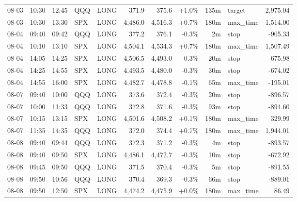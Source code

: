 \documentclass[11pt,a4paper,twoside]{article}
\begin{document}
\begin{center}
\begin{longtable}{>{\color{txtmain}}l l l l l r r r r >{\color{txtmain}}l r}
08-03 & 10:30 & 12:45 & QQQ & LONG & 371.9 & 375.6 & \textcolor{wingreen}{+1.0\%} & 135m & target & \textcolor{wingreen}{2,975.04} \\
08-03 & 10:30 & 13:30 & SPX & LONG & 4,486.0 & 4,516.3 & \textcolor{wingreen}{+0.7\%} & 180m & max\_time & \textcolor{wingreen}{1,514.00} \\
08-04 & 09:40 & 09:42 & QQQ & LONG & 377.2 & 376.1 & \textcolor{lossred}{-0.3\%} & 2m & stop & \textcolor{lossred}{-905.33} \\
08-04 & 10:10 & 13:10 & SPX & LONG & 4,504.1 & 4,534.3 & \textcolor{wingreen}{+0.7\%} & 180m & max\_time & \textcolor{wingreen}{1,507.49} \\
08-04 & 14:05 & 14:25 & SPX & LONG & 4,506.5 & 4,493.0 & \textcolor{lossred}{-0.3\%} & 20m & stop & \textcolor{lossred}{-675.98} \\
08-04 & 14:25 & 14:55 & SPX & LONG & 4,493.5 & 4,480.0 & \textcolor{lossred}{-0.3\%} & 30m & stop & \textcolor{lossred}{-674.02} \\
08-04 & 14:55 & 16:00 & SPX & LONG & 4,482.7 & 4,478.8 & \textcolor{lossred}{-0.1\%} & 65m & max\_time & \textcolor{lossred}{-195.01} \\
08-07 & 09:40 & 10:00 & QQQ & LONG & 373.6 & 372.4 & \textcolor{lossred}{-0.3\%} & 20m & stop & \textcolor{lossred}{-896.57} \\
08-07 & 10:00 & 11:33 & QQQ & LONG & 372.8 & 371.6 & \textcolor{lossred}{-0.3\%} & 93m & stop & \textcolor{lossred}{-894.60} \\
08-07 & 10:15 & 13:15 & SPX & LONG & 4,501.6 & 4,508.2 & \textcolor{wingreen}{+0.1\%} & 180m & max\_time & \textcolor{wingreen}{329.99} \\
08-07 & 11:35 & 14:35 & QQQ & LONG & 372.0 & 374.4 & \textcolor{wingreen}{+0.7\%} & 180m & max\_time & \textcolor{wingreen}{1,944.01} \\
08-08 & 09:40 & 09:44 & QQQ & LONG & 372.3 & 371.2 & \textcolor{lossred}{-0.3\%} & 4m & stop & \textcolor{lossred}{-893.57} \\
08-08 & 09:40 & 09:50 & SPX & LONG & 4,486.1 & 4,472.7 & \textcolor{lossred}{-0.3\%} & 10m & stop & \textcolor{lossred}{-672.92} \\
08-08 & 09:45 & 09:50 & QQQ & LONG & 371.5 & 370.4 & \textcolor{lossred}{-0.3\%} & 5m & stop & \textcolor{lossred}{-891.55} \\
08-08 & 09:50 & 10:56 & QQQ & LONG & 370.4 & 369.3 & \textcolor{lossred}{-0.3\%} & 66m & stop & \textcolor{lossred}{-889.01} \\
08-08 & 09:50 & 12:50 & SPX & LONG & 4,474.2 & 4,475.9 & \textcolor{wingreen}{+0.0\%} & 180m & max\_time & \textcolor{wingreen}{86.49} \\

\end{longtable}
\end{center}
\end{document}
